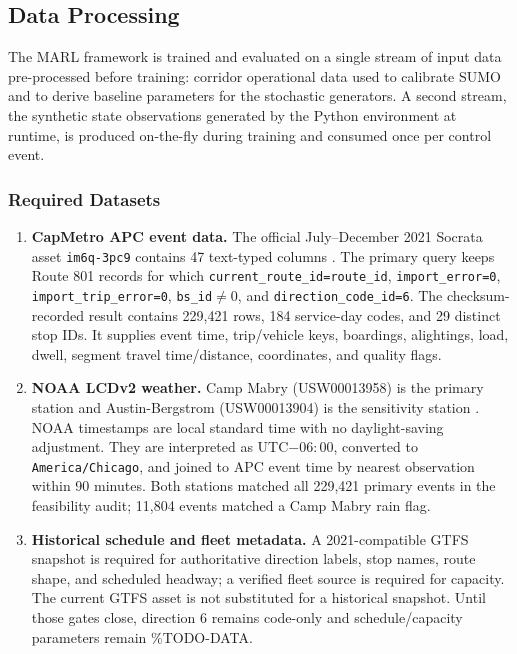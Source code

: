 \subsection{Data Processing}

The MARL framework is trained and evaluated on a single stream of input data pre-processed before training: corridor operational data used to calibrate SUMO and to derive baseline parameters for the stochastic generators. A second stream, the synthetic state observations generated by the Python environment at runtime, is produced on-the-fly during training and consumed once per control event.

\subsubsection{Required Datasets}

\begin{enumerate}
\item \textbf{CapMetro APC event data.} The official July--December 2021 Socrata asset \texttt{im6q-3pc9} contains 47 text-typed columns \cite{TexasCapMetroAPC2021}. The primary query keeps Route 801 records for which \texttt{current\_route\_id=route\_id}, \texttt{import\_error=0}, \texttt{import\_trip\_error=0}, \texttt{bs\_id}$\neq 0$, and \texttt{direction\_code\_id=6}. The checksum-recorded result contains 229{,}421 rows, 184 service-day codes, and 29 distinct stop IDs. It supplies event time, trip/vehicle keys, boardings, alightings, load, dwell, segment travel time/distance, coordinates, and quality flags.

\item \textbf{NOAA LCDv2 weather.} Camp Mabry (USW00013958) is the primary station and Austin-Bergstrom (USW00013904) is the sensitivity station \cite{NOAALCDv2}. NOAA timestamps are local standard time with no daylight-saving adjustment. They are interpreted as UTC$-06{:}00$, converted to \texttt{America/Chicago}, and joined to APC event time by nearest observation within 90 minutes. Both stations matched all 229{,}421 primary events in the feasibility audit; 11{,}804 events matched a Camp Mabry rain flag.

\item \textbf{Historical schedule and fleet metadata.} A 2021-compatible GTFS snapshot is required for authoritative direction labels, stop names, route shape, and scheduled headway; a verified fleet source is required for capacity. The current GTFS asset \cite{CapMetroGTFS} is not substituted for a historical snapshot. Until those gates close, direction 6 remains code-only and schedule/capacity parameters remain \%TODO-DATA.
\end{enumerate}

